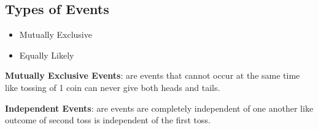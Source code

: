 \documentclass[./EngineeringMaths.tex]{subfiles}
\begin{document}
\subsection*{Types of Events}

\begin{itemize}
\item Mutually Exclusive
\item Equally Likely
\end{itemize}

\begin{notes}
\textbf{Mutually Exclusive Events}: are events that cannot occur at the same time like tossing of 1 coin can never give both heads and tails.
\vspace{0.5cm}

\textbf{Independent Events}: are events are completely independent of one another like outcome of second toss is independent of the first toss.
\end{notes}
\end{document}
